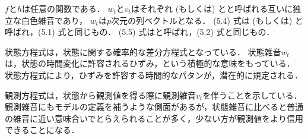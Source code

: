 \documentclass[11pt,a4paper]{jsarticle}
\numberwithin{equation}{section}
\begin{document}
$f$と$h$は任意の関数である．
$w_t$と$v_t$はそれぞれ (もしくは) とと呼ばれる互いに独立な白色雑音であり，
$w_t$は$p$次元の列ベクトルとなる．
(5.4) 式は (もしくは) と呼ばれ，(5.1) 式と同じもの．
(5.5) 式はと呼ばれ，(5.2) 式と同じもの．

状態方程式は，状態に関する確率的な差分方程式となっている．
状態雑音$w_t$は，状態の時間変化に許容されるひずみ，という積極的な意味をもっている．
状態方程式により，ひずみを許容する時間的なパタンが，潜在的に規定される．

観測方程式は，状態から観測値を得る際に観測雑音$v_t$を伴うことを示している．
観測雑音にもモデルの定義を補うような側面があるが，状態雑音に比べると普通の雑音に近い意味合いでとらえられることが多く，少ない方が観測値をより信用できることになる．
\end{document}
